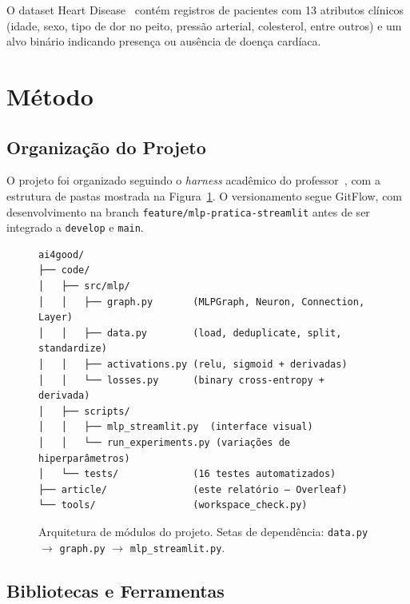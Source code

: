 \documentclass[runningheads]{llncs}
\begin{document}
O dataset Heart Disease~\cite{ref_heart} contém registros de pacientes
com 13 atributos clínicos (idade, sexo, tipo de dor no peito,
pressão arterial, colesterol, entre outros) e um alvo binário indicando
presença ou ausência de doença cardíaca.

\section{Método}

\subsection{Organização do Projeto}

O projeto foi organizado seguindo o \textit{harness} acadêmico do
professor~\cite{ref_harness}, com a estrutura de pastas mostrada
na Figura~\ref{fig:arch}. O versionamento segue GitFlow, com
desenvolvimento na branch \texttt{feature/mlp-pratica-streamlit}
antes de ser integrado a \texttt{develop} e \texttt{main}.

\begin{figure}[H]
\centering
\small
\begin{verbatim}
ai4good/
├── code/
│   ├── src/mlp/
│   │   ├── graph.py       (MLPGraph, Neuron, Connection, Layer)
│   │   ├── data.py        (load, deduplicate, split, standardize)
│   │   ├── activations.py (relu, sigmoid + derivadas)
│   │   └── losses.py      (binary cross-entropy + derivada)
│   ├── scripts/
│   │   ├── mlp_streamlit.py  (interface visual)
│   │   └── run_experiments.py (variações de hiperparâmetros)
│   └── tests/             (16 testes automatizados)
├── article/               (este relatório — Overleaf)
└── tools/                 (workspace_check.py)
\end{verbatim}
\caption{Arquitetura de módulos do projeto. Setas de dependência:
\texttt{data.py} $\rightarrow$ \texttt{graph.py} $\rightarrow$
\texttt{mlp\_streamlit.py}.}
\label{fig:arch}
\end{figure}

\subsection{Bibliotecas e Ferramentas}
\end{document}
